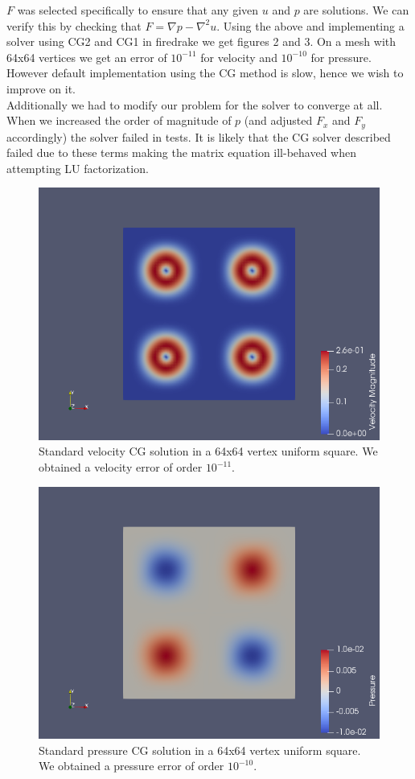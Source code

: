 \documentclass[11pt,twoside,a4paper]{article}
\begin{document}
$F$ was selected specifically to ensure that any given $u$ and $p$ are solutions. We can verify this by checking that $F = \nabla p - \nabla^2 u$.
Using the above and implementing a solver using CG2 and CG1 in firedrake we get figures 2 and 3. On a mesh with 64x64 vertices we get an error of $10^{-11}$ for velocity and $10^{-10}$ for pressure.\\
However default implementation using the CG method is slow, hence we wish to improve on it.\\
Additionally we had to modify our problem for the solver to converge at all. When we increased the order of magnitude of $p$ (and adjusted $F_x$ and $F_y$ accordingly) the solver failed in tests. It is likely that the CG solver described failed due to these terms making the matrix equation ill-behaved  when attempting LU factorization.
\begin{figure}
  \includegraphics[width=\linewidth]{lgv.png}
  \caption{Standard velocity CG solution in a 64x64 vertex uniform square. We obtained a velocity error of order $10^{-11}$.}
\end{figure}
\begin{figure}
  \includegraphics[width=\linewidth]{lgp.png}
  \caption{Standard pressure CG solution in a 64x64 vertex uniform square. We obtained a pressure error of order $10^{-10}$.}
\end{figure}
\end{document}
